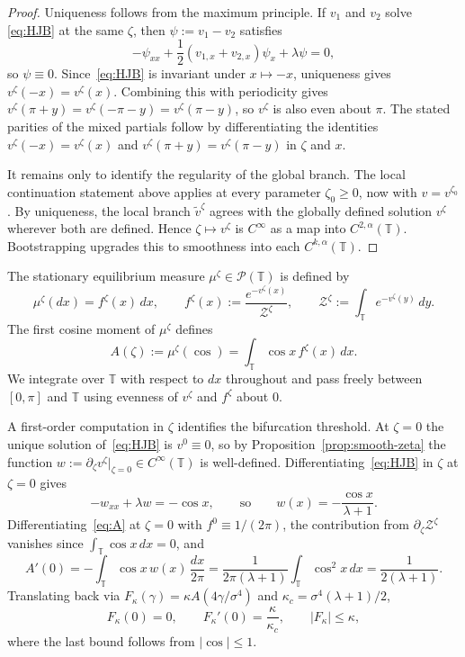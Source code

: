 \documentclass{amsart}
\newcommand{\T}{\mathbb T}
\begin{document}
\begin{proof}
Uniqueness follows from the maximum principle. If $v_1$ and $v_2$ solve
\eqref{eq:HJB} at the same $\zeta$, then $\psi:=v_1-v_2$ satisfies
\[
-\psi_{xx}+\frac12(v_{1,x}+v_{2,x})\psi_x+\lambda\psi=0,
\]
so $\psi\equiv0$. Since~\eqref{eq:HJB} is invariant under $x\mapsto-x$,
uniqueness gives $v^\zeta(-x)=v^\zeta(x)$. Combining this with
periodicity gives
$v^\zeta(\pi+y)=v^\zeta(-\pi-y)=v^\zeta(\pi-y)$, so $v^\zeta$ is also
even about $\pi$. The stated parities of the mixed partials follow by
differentiating the identities $v^\zeta(-x)=v^\zeta(x)$ and
$v^\zeta(\pi+y)=v^\zeta(\pi-y)$ in $\zeta$ and $x$.

It remains only to identify the regularity of the global branch. The
local continuation statement above applies at every parameter
$\zeta_0\geq0$, now with $v=v^{\zeta_0}$. By uniqueness, the local
branch $\tilde v^\zeta$ agrees with the globally defined solution
$v^\zeta$ wherever both are defined. Hence
$\zeta\mapsto v^\zeta$ is $C^\infty$ as a map into
$C^{2,\alpha}(\T)$. Bootstrapping upgrades this to smoothness
into each $C^{k,\alpha}(\T)$.
\end{proof}

The stationary equilibrium measure $\mu^\zeta\in\mathcal P(\T)$ is defined
by
\begin{equation}\label{eq:mu}
\mu^\zeta(dx)=f^\zeta(x)\,dx,
\qquad
f^\zeta(x):=\frac{e^{-v^\zeta(x)}}{\mathcal Z^\zeta},
\qquad
\mathcal Z^\zeta:=\int_\T e^{-v^\zeta(y)}\,dy.
\end{equation}
The first cosine moment of $\mu^\zeta$ defines
\begin{equation}\label{eq:A}
A(\zeta):=\mu^\zeta(\cos)=\int_\T \cos x\,f^\zeta(x)\,dx.
\end{equation}
We integrate over $\T$ with respect to $dx$ throughout and pass freely
between $[0,\pi]$ and $\T$ using evenness of $v^\zeta$ and $f^\zeta$ about
$0$.

A first-order computation in $\zeta$ identifies the bifurcation
threshold. At $\zeta=0$ the unique solution of~\eqref{eq:HJB} is
$v^0\equiv 0$, so by Proposition~\ref{prop:smooth-zeta} the function
$w:=\partial_\zeta v^\zeta|_{\zeta=0}\in C^\infty(\T)$ is well-defined.
Differentiating~\eqref{eq:HJB} in $\zeta$ at $\zeta=0$ gives
\[
-w_{xx}+\lambda w=-\cos x,
\qquad\text{so}\qquad w(x)=-\frac{\cos x}{\lambda+1}.
\]
Differentiating~\eqref{eq:A} at $\zeta=0$ with $f^0\equiv 1/(2\pi)$,
the contribution from $\partial_\zeta\mathcal Z^\zeta$ vanishes since
$\int_\T\cos x\,dx=0$, and
\[
A'(0)=-\int_\T \cos x\,w(x)\,\frac{dx}{2\pi}
=\frac{1}{2\pi(\lambda+1)}\int_\T\cos^2 x\,dx
=\frac{1}{2(\lambda+1)}.
\]
Translating back via $F_\kappa(\gamma)=\kappa A(4\gamma/\sigma^4)$ and
$\kappa_c=\sigma^4(\lambda+1)/2$,
\begin{equation}\label{eq:F-properties}
F_\kappa(0)=0,\qquad F_\kappa'(0)=\frac{\kappa}{\kappa_c},\qquad |F_\kappa|\leq\kappa,
\end{equation}
where the last bound follows from $|\cos|\leq 1$.
\end{document}
